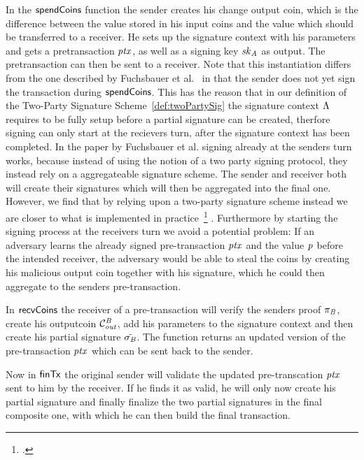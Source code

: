In the $\mathsf{spendCoins}$ function the sender creates his change output coin, which is the difference between the value stored in his input coins and the value which should be transferred to a receiver.
He sets up the signature context with his parameters and gets a pretransaction $\mathit{ptx}$, as well as a signing key $\mathit{sk}_{\mathit{A}}$ as output. The pretransaction can then be sent to a receiver.
Note that this instantiation differs from the one described by Fuchsbauer et al.~\cite{fuchsbauer2019aggregate} in that the sender does not yet sign the transaction during $\mathsf{spendCoins}$. This has
the reason that in our definition of the Two-Party Signature Scheme~\ref{def:twoPartySig} the signature context $\Lambda$ requires to be fully setup before a partial signature can be created, therfore
signing can only start at the recievers turn, after the signature context has been completed. In the paper by Fuchsbauer et al. signing already at the senders turn works, because instead of using the notion
of a two party signing protocol, they instead rely on a aggregateable signature scheme. The sender and receiver both will create their signatures which will then be aggregated into the final one. However,
we find that by relying upon a two-party signature scheme instead we are closer to what is implemented in practice~\footcite{https://medium.com/@brandonarvanaghi/grin-transactions-explained-step-by-step-fdceb905a853} .
Furthermore by starting the signing process at the receivers turn we avoid a potential problem: If an adversary learns the already signed pre-transaction $\mathit{ptx}$ and the value $\mathit{p}$ before the
intended receiver, the adversary would be able to steal the coins by creating his malicious output coin together with his signature, which he could then aggregate to the senders pre-transaction.

In $\mathsf{recvCoins}$ the receiver of a pre-transaction will verify the senders proof $\pi_{\mathit{B}}$, create his outputcoin $\mathcal{C}_{\mathit{out}}^{\mathit{B}}$, add his parameters to the signature context and then create his partial signature $\tilde{\sigma_{\mathit{B}}}$.
The function returns an updated version of the pre-transaction $\mathit{ptx}$ which can be sent back to the sender.

Now in $\mathsf{finTx}$ the original sender will validate the updated pre-transcation $\mathit{ptx}$ sent to him by the receiver. If he finds it as valid, he will only now create his partial signature and finally
finalize the two partial signatures in the final composite one, with which he can then build the final transaction.


